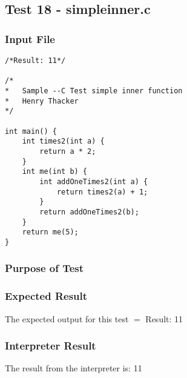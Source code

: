 \subsection{Test 18 - simpleinner.c}
\subsubsection{Input File}
\begin{lstlisting}[showstringspaces=false,breaklines=true,backgroundcolor=\color{light-gray}, captionpos=b]
/*Result: 11*/

/*
*	Sample --C Test simple inner function
*	Henry Thacker
*/

int main() {
	int times2(int a) {
		return a * 2;
	}
	int me(int b) {
		int addOneTimes2(int a) { 
			return times2(a) + 1; 
		}
		return addOneTimes2(b);
	}
	return me(5);
}
\end{lstlisting}\subsubsection{Purpose of Test}

\subsubsection{Expected Result}
The expected output for this test $=$ Result: 11
\subsubsection{Interpreter Result}
The result from the interpreter is: 11
